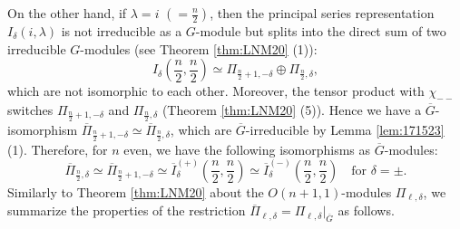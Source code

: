 On the other hand, 
 if $\lambda=i$ $(=\frac n 2)$, 
 then the principal series representation $I_{\delta}(i,\lambda)$ is not irreducible as a $G$-module 
 but splits into the direct sum
 of two irreducible $G$-modules
 (see Theorem \ref{thm:LNM20} (1)):
\[
   I_{\delta}(\frac n 2,\frac n 2) \simeq \Pi_{\frac n 2+1,-\delta} \oplus \Pi_{\frac n 2,\delta}, 
\]
which are not isomorphic to each other.  
Moreover,
 the tensor product with $\chi_{--}$
 switches $\Pi_{\frac n 2+1,-\delta}$ and $\Pi_{\frac n 2,\delta}$
 (Theorem \ref{thm:LNM20} (5)).  
Hence we have a 
$
   \overline G$-isomorphism $\overline \Pi_{\frac n 2+1,-\delta}
   \simeq \overline\Pi_{\frac n 2,\delta}
$,
 which are $\overline G$-irreducible by Lemma \ref{lem:171523} (1).  
Therefore, 
 for $n$ even, 
 we have the following isomorphisms as $\overline G$-modules:
\begin{equation}
\label{eqn:161733}
\overline{\Pi}_{\frac n 2, \delta}
\simeq
\overline{\Pi}_{\frac n 2+1, -\delta}
\simeq
\overline{I}_{\delta}^{(+)}({\frac n 2}, \frac n2)
\simeq 
\overline{I}_{\delta}^{(-)}({\frac n 2}, \frac n2)
\quad
\text{for $\delta = \pm$}.  
\end{equation}
Similarly to Theorem \ref{thm:LNM20} 
 about the $O(n+1,1)$-modules $\Pi_{\ell,\delta}$, 
 we summarize the properties of the restriction $\overline{\Pi}_{\ell,\delta}=\Pi_{\ell,\delta}|_{\overline G}$ as follows.  
